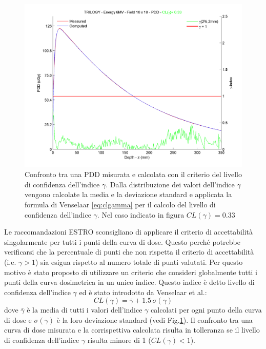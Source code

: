\begin{figure}
\centering
\includegraphics[width=.9\textwidth]{./cap2/pdd10x10.png}
\caption{Confronto tra una PDD misurata e calcolata con il criterio del livello di confidenza dell'indice $\gamma$. Dalla distribuzione dei valori dell'indice $\gamma$ vengono calcolate la media e la deviazione standard e applicata la formula di Venselaar \eqref{eq:clgamma} per il calcolo del livello di confidenza dell'indice $\gamma$. Nel caso indicato in figura $CL(\gamma)=0.33$}
\label{fig:gamma10x10}
\end{figure}

Le raccomandazioni ESTRO sconsigliano di applicare il criterio di accettabilità singolarmente per tutti i punti della curva di dose. Questo perché potrebbe verificarsi che la percentuale di punti che non rispetta il criterio di accettabilità (i.e. $\gamma > 1$) sia esigua rispetto al numero totale di punti valutati. Per questo motivo è stato proposto di utilizzare un criterio che consideri globalmente tutti i punti della curva dosimetrica in un unico indice. Questo indice è detto livello di confidenza dell'indice $\gamma$ ed è stato introdotto da Venselaar et al.\cite{Venselaar2001}:
\begin{equation}
CL(\gamma) = \bar{\gamma} + 1.5\,\sigma(\gamma)
\label{eq:clgamma}
\end{equation}
dove $\bar{\gamma}$ è la media di tutti i valori dell'indice $\gamma$ calcolati per ogni punto della curva di dose e $\sigma(\gamma)$ è la loro deviazione standard (vedi Fig.\ref{fig:gamma10x10}).
Il confronto tra una curva di dose misurata e la corrispettiva calcolata risulta in tolleranza se il livello di confidenza dell'indice $\gamma$ risulta minore di 1 ($CL(\gamma) < 1$).


